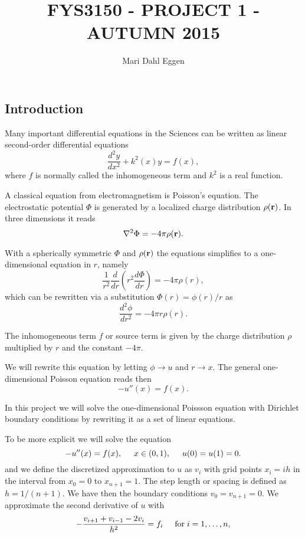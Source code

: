 \documentclass[12pt]{article}
\begin{document}
\title{FYS3150 - PROJECT 1 - AUTUMN 2015}
\author{Mari Dahl Eggen}
\maketitle

\newpage

\begin{flushleft}
\section*{Introduction}
Many important differential equations in the Sciences can be written as 
linear second-order differential equations 
$$\frac{d^2y}{dx^2}+k^2(x)y = f(x),$$
where $f$ is normally called the inhomogeneous term and $k^2$ is a real function.

A classical equation from electromagnetism is Poisson's equation.
The electrostatic potential $\Phi$ is generated by a localized charge
distribution $\rho ({\bf r})$.   In three dimensions 
it reads
$$\nabla^2 \Phi = -4\pi \rho ({\bf r}).$$

With a spherically symmetric $\Phi$ and $\rho ({\bf r})$  the equations
simplifies to a one-dimensional equation in $r$, namely
$$\frac{1}{r^2}\frac{d}{dr}\left(r^2\frac{d\Phi}{dr}\right) = -4\pi \rho(r),$$
which can be rewritten via a substitution $\Phi(r)= \phi(r)/r$ as
$$\frac{d^2\phi}{dr^2}= -4\pi r\rho(r).$$

The inhomogeneous term $f$ or source term is given by the charge distribution
$\rho$  multiplied by $r$ and the constant $-4\pi$.

We will rewrite this equation by letting $\phi\rightarrow u$ and 
$r\rightarrow x$. 
The general one-dimensional Poisson equation reads then 
$$-u''(x) = f(x).$$

In this project we will solve the one-dimensional Poissson equation
with Dirichlet boundary conditions by	 rewriting it as a set of linear equations.

To be more explicit we will solve the equation
$$-u''(x) = f(x), \hspace{0.5cm} x\in(0,1), \hspace{0.5cm} u(0) = u(1) = 0.$$
and we define the discretized approximation  to $u$ as $v_i$  with grid points $x_i=ih$ in the interval from $x_0=0$ to $x_{n+1}=1$.
The step length or spacing is defined as $h=1/(n+1)$. 
We have then the boundary conditions $v_0 = v_{n+1} = 0$.
We  approximate the second
derivative of $u$ with 
\begin{equation}\label{eq:double_derivative}
-\frac{v_{i+1}+v_{i-1}-2v_i}{h^2} = f_i  \hspace{0.5cm} \mathrm{for} \hspace{0.1cm} i=1,\dots, n,
\end{equation}


\end{flushleft}
\end{document}
